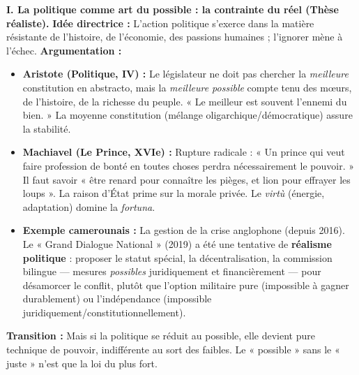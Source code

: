 \documentclass[11pt]{article}
\newcommand{\cle}[1]{{\popxbold\color{popdark}#1}}
\begin{document}
\begin{exoresolu}
\textbf{I. La politique comme art du possible : la contrainte du réel (Thèse réaliste).}
\textbf{Idée directrice :} L'action politique s'exerce dans la matière résistante de l'histoire, de l'économie, des passions humaines ; l'ignorer mène à l'échec.
\textbf{Argumentation :}
\begin{itemize}
    \item \textbf{Aristote (Politique, IV) :} Le législateur ne doit pas chercher la \emph{meilleure} constitution en abstracto, mais la \emph{meilleure possible} compte tenu des mœurs, de l'histoire, de la richesse du peuple. « Le meilleur est souvent l'ennemi du bien. » La \cle{moyenne constitution} (mélange oligarchique/démocratique) assure la stabilité.
    \item \textbf{Machiavel (Le Prince, XVIe) :} Rupture radicale : « Un prince qui veut faire profession de bonté en toutes choses perdra nécessairement le pouvoir. » Il faut savoir « être renard pour connaître les pièges, et lion pour effrayer les loups ». La \cle{raison d'État} prime sur la morale privée. Le \emph{virtù} (énergie, adaptation) domine la \emph{fortuna}.
    \item \textbf{Exemple camerounais :} La gestion de la crise anglophone (depuis 2016). Le « Grand Dialogue National » (2019) a été une tentative de \textbf{réalisme politique} : proposer le statut spécial, la décentralisation, la commission bilingue — mesures \emph{possibles} juridiquement et financièrement — pour désamorcer le conflit, plutôt que l'option militaire pure (impossible à gagner durablement) ou l'indépendance (impossible juridiquement/constitutionnellement).
\end{itemize}
\textbf{Transition :} Mais si la politique se réduit au possible, elle devient pure technique de pouvoir, indifférente au sort des faibles. Le « possible » sans le « juste » n'est que la loi du plus fort.


\end{exoresolu}
\end{document}

